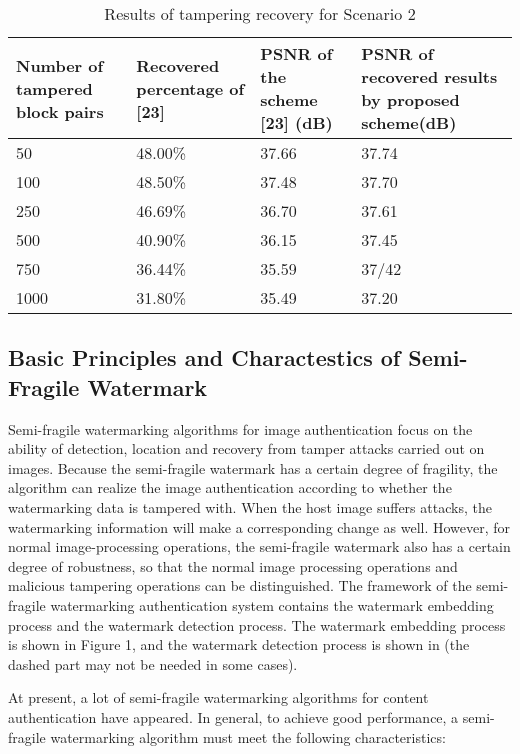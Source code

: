 \documentclass[draft, {\secondLanguage}, english]{volcanica-template}
\begin{document}
\begin{table}[!thbp]
\centering
\caption{Results of tampering recovery for Scenario 2}
\begin{tabularx}{\textwidth}{
|X|X|X|X|
}
\toprule	
{Number of tampered block pairs} & {Recovered percentage of [23]} & {PSNR of the scheme [23] (dB)} &{PSNR of recovered results by proposed scheme(dB)}\\	
\midrule										
50 & 48.00\% & 37.66 & 37.74\\
\hline
100 &48.50\% & 37.48 & 37.70\\
\hline
250	&46.69\% & 36.70 & 37.61\\
\hline
500 &40.90\% & 36.15 & 37.45\\
\hline
750 &36.44\% & 35.59 & 37/42\\
\hline
1000 &31.80\% & 35.49 & 37.20\\
\hline
							
\end{tabularx}
\label{tab:01}
\end{table}

\subsection{Basic Principles and Charactestics of Semi-Fragile Watermark}
Semi-fragile watermarking algorithms for image authentication focus on the ability of detection, location and recovery from tamper attacks carried out on images. Because the semi-fragile watermark has a certain degree of fragility, the algorithm can realize the image authentication according to whether the watermarking data is tampered with. When the host image suffers attacks, the watermarking information will make a corresponding change as well. However, for normal image-processing operations, the semi-fragile watermark also has a certain degree of robustness, so that the normal image processing operations and malicious tampering operations can be distinguished. The framework of the semi-fragile watermarking authentication system contains the watermark embedding process and the watermark detection process. The watermark embedding process is shown in Figure 1, and the watermark detection process is shown in (the dashed part may not be needed in some cases).

At present, a lot of semi-fragile watermarking algorithms for content authentication have appeared. In general, to achieve good performance, a semi-fragile watermarking algorithm must meet the following characteristics:
\end{document}

